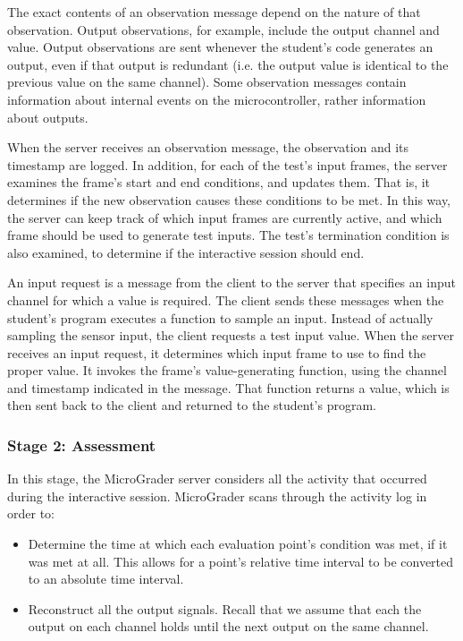 \documentclass[12pt]{article}
\begin{document}
The exact contents of an observation message depend on the nature of that observation.  Output observations, for example, include the output channel and value.  Output observations are sent whenever the student's code generates an output, even if that output is redundant (i.e. the output value is identical to the previous value on the same channel).  Some observation messages contain information about internal events on the microcontroller, rather information about outputs.

When the server receives an observation message, the observation and its timestamp are logged.  In addition, for each of the test's input frames, the server examines the frame's start and end conditions, and updates them.  That is, it determines if the new observation causes these conditions to be met.  In this way, the server can keep track of which input frames are currently active, and which frame should be used to generate test inputs.  The test's termination condition is also examined, to determine if the interactive session should end.

An input request is a message from the client to the server that specifies an input channel for which a value is required.  The client sends these messages when the student's program executes a function to sample an input.  Instead of actually sampling the sensor input, the client requests a test input value.  When the server receives an input request, it determines which input frame to use to find the proper value.  It invokes the frame's value-generating function, using the channel and timestamp indicated in the message.  That function returns a value, which is then sent back to the client and returned to the student's program.

\subsubsection{Stage 2: Assessment}
In this stage, the MicroGrader server considers all the activity that occurred during the interactive session.  MicroGrader scans through the activity log in order to:

\begin{itemize}
\item Determine the time at which each evaluation point's condition was met, if it was met at all.  This allows for a point's relative time interval to be converted to an absolute time interval.
\item Reconstruct all the output signals.  Recall that we assume that each the output on each channel holds until the next output on the same channel.
\end{itemize}
\end{document}
